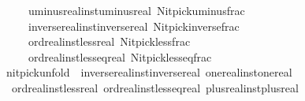 \begin{isabellebody}
\ \ \ \ \ {\isacharparenleft}{\kern0pt}\isactrlconstUNDERSCOREname {\isasymopen}uminus{\isacharunderscore}{\kern0pt}real{\isacharunderscore}{\kern0pt}inst{\isachardot}{\kern0pt}uminus{\isacharunderscore}{\kern0pt}real{\isasymclose}{\isacharcomma}{\kern0pt}\ \isactrlconstUNDERSCOREname {\isasymopen}Nitpick{\isachardot}{\kern0pt}uminus{\isacharunderscore}{\kern0pt}frac{\isasymclose}{\isacharparenright}{\kern0pt}{\isacharcomma}{\kern0pt}\isanewline
\ \ \ \ \ {\isacharparenleft}{\kern0pt}\isactrlconstUNDERSCOREname {\isasymopen}inverse{\isacharunderscore}{\kern0pt}real{\isacharunderscore}{\kern0pt}inst{\isachardot}{\kern0pt}inverse{\isacharunderscore}{\kern0pt}real{\isasymclose}{\isacharcomma}{\kern0pt}\ \isactrlconstUNDERSCOREname {\isasymopen}Nitpick{\isachardot}{\kern0pt}inverse{\isacharunderscore}{\kern0pt}frac{\isasymclose}{\isacharparenright}{\kern0pt}{\isacharcomma}{\kern0pt}\isanewline
\ \ \ \ \ {\isacharparenleft}{\kern0pt}\isactrlconstUNDERSCOREname {\isasymopen}ord{\isacharunderscore}{\kern0pt}real{\isacharunderscore}{\kern0pt}inst{\isachardot}{\kern0pt}less{\isacharunderscore}{\kern0pt}real{\isasymclose}{\isacharcomma}{\kern0pt}\ \isactrlconstUNDERSCOREname {\isasymopen}Nitpick{\isachardot}{\kern0pt}less{\isacharunderscore}{\kern0pt}frac{\isasymclose}{\isacharparenright}{\kern0pt}{\isacharcomma}{\kern0pt}\isanewline
\ \ \ \ \ {\isacharparenleft}{\kern0pt}\isactrlconstUNDERSCOREname {\isasymopen}ord{\isacharunderscore}{\kern0pt}real{\isacharunderscore}{\kern0pt}inst{\isachardot}{\kern0pt}less{\isacharunderscore}{\kern0pt}eq{\isacharunderscore}{\kern0pt}real{\isasymclose}{\isacharcomma}{\kern0pt}\ \isactrlconstUNDERSCOREname {\isasymopen}Nitpick{\isachardot}{\kern0pt}less{\isacharunderscore}{\kern0pt}eq{\isacharunderscore}{\kern0pt}frac{\isasymclose}{\isacharparenright}{\kern0pt}{\isacharbrackright}{\kern0pt}\isanewline
{\isacartoucheclose}%
\endisatagML
{\isafoldML}%
%
\isadelimML
%
\endisadelimML
\isanewline
\isanewline
{}\isamarkupfalse%
\ {\isacharbrackleft}{\kern0pt}nitpick{\isacharunderscore}{\kern0pt}unfold{\isacharbrackright}{\kern0pt}\ {\isacharequal}{\kern0pt}\ inverse{\isacharunderscore}{\kern0pt}real{\isacharunderscore}{\kern0pt}inst{\isachardot}{\kern0pt}inverse{\isacharunderscore}{\kern0pt}real\ one{\isacharunderscore}{\kern0pt}real{\isacharunderscore}{\kern0pt}inst{\isachardot}{\kern0pt}one{\isacharunderscore}{\kern0pt}real\isanewline
\ \ ord{\isacharunderscore}{\kern0pt}real{\isacharunderscore}{\kern0pt}inst{\isachardot}{\kern0pt}less{\isacharunderscore}{\kern0pt}real\ ord{\isacharunderscore}{\kern0pt}real{\isacharunderscore}{\kern0pt}inst{\isachardot}{\kern0pt}less{\isacharunderscore}{\kern0pt}eq{\isacharunderscore}{\kern0pt}real\ plus{\isacharunderscore}{\kern0pt}real{\isacharunderscore}{\kern0pt}inst{\isachardot}{\kern0pt}plus{\isacharunderscore}{\kern0pt}real\isanewline

\end{isabellebody}

